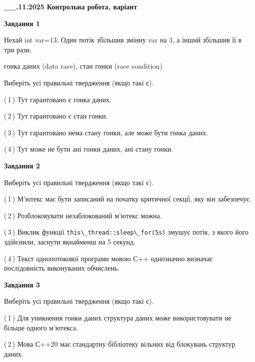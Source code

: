 \documentclass[12pt, ukrainian]{article}
\def\code#1{\Verb!#1!}
\begin{document}
\begin {large}

\textbf{\_\_.11.2025 Контрольна робота, варіант  }\par


{

\begin{center}
\textbf{Завдання 1}
\end{center}
Нехай int var=13; Один потік збільшив змінну var на 3, а інший збільшив її в три рази.

гонка даних (data race), стан гонки (race condition)

Виберіть усі правильні твердження (якщо такі є).\par
\vspace{2mm}
(\,1\,) Тут гарантовано є гонка даних.%

(\,2\,) Тут гарантовано є стан гонки.%

(\,3\,) Тут гарантовано нема стану гонки, але може бути гонка даних.%

(\,4\,) Тут може не бути ані гонки даних, ані стану гонки.%



\begin{center}
\textbf{Завдання 2}
\end{center}
Виберіть усі правильні твердження (якщо такі є).\par
\vspace{2mm}

(\,1\,) М’ютекс має бути записаний на початку критичної секції, яку він забезпечує.%

(\,2\,) Розблоковувати незаблокований м’ютекс можна.%

(\,3\,) Виклик функції \code{this\_thread::sleep\_for(5s)} змушує потік, з якого його здійснили, заснути якнайменш на 5 секунд.%

(\,4\,) Текст однопотокової програми мовою С++ однозначно визначає послідовність виконуваних обчислень.%



\begin{center}
\textbf{Завдання 3}
\end{center}
Виберіть усі правильні твердження (якщо такі є).\par
\vspace{2mm}

(\,1\,) Для уникнення гонки даних структура даних може використовувати не більше одного м’ютекса.%

(\,2\,) Мова С++20 має стандартну бібліотеку вільних від блокувань структур даних.%

}
\end{large}
\end{document}
